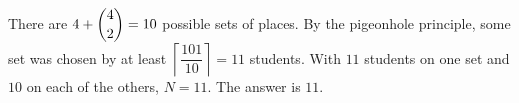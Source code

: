 There are $4+\dbinom42=10$ possible sets of places. By the pigeonhole principle, some set was chosen by at least $\left\lceil\dfrac{101}{10}\right\rceil=11$ students. With $11$ students on one set and $10$ on each of the others, $N=11$. The answer is $\boxed{11}$.
